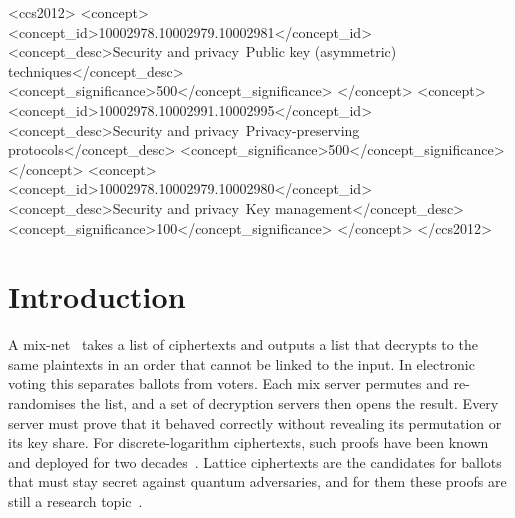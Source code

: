 \documentclass[sigconf,anonymous]{acmart}
\begin{document}
\begin{CCSXML}
<ccs2012>
 <concept>
  <concept_id>10002978.10002979.10002981</concept_id>
  <concept_desc>Security and privacy~Public key (asymmetric) techniques</concept_desc>
  <concept_significance>500</concept_significance>
 </concept>
 <concept>
  <concept_id>10002978.10002991.10002995</concept_id>
  <concept_desc>Security and privacy~Privacy-preserving protocols</concept_desc>
  <concept_significance>500</concept_significance>
 </concept>
 <concept>
  <concept_id>10002978.10002979.10002980</concept_id>
  <concept_desc>Security and privacy~Key management</concept_desc>
  <concept_significance>100</concept_significance>
 </concept>
</ccs2012>
\end{CCSXML}


\maketitle

\section{Introduction}

A mix-net~\cite{Chaum81} takes a list of ciphertexts and outputs a list that decrypts to the same
plaintexts in an order that cannot be linked to the input. In electronic voting this separates
ballots from voters. Each mix server permutes and re-randomises the list, and a set of decryption
servers then opens the result. Every server must prove that it behaved correctly without revealing
its permutation or its key share. For discrete-logarithm ciphertexts, such proofs have been known and
deployed for two decades~\cite{Neff01,BG12}. Lattice ciphertexts are the candidates for ballots
that must stay secret against quantum adversaries, and for them these proofs are still a research
topic~\cite{CMM19,Strand18,ABGSctrsa21,FWK21,HMS21,ABGS23,BLM25}.
\end{document}
